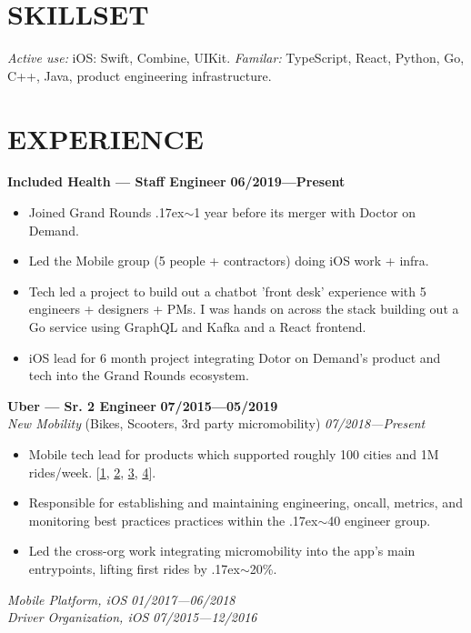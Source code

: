 \documentclass[line,margin]{res}
\newcommand{\goodtilde}{\raise.17ex\hbox{$\scriptstyle\mathtt{\sim}$}}
\begin{document}
\address{adam@zethrae.us}
\address{+1 (401) 339-8675}

 
\begin{resume}

\section{SKILLSET}
    {\sl Active use:} iOS: Swift, Combine, UIKit.
    {\sl Familar:} TypeScript, React, Python, Go, C++, Java, product engineering infrastructure.

\section{EXPERIENCE}
    \textbf{Included Health — Staff Engineer} \hfill \textbf{06/2019—Present}
    \begin{itemize}  \itemsep -1pt
        \item Joined Grand Rounds \goodtilde1 year before its merger with Doctor on Demand.
        \item Led the Mobile group (5 people + contractors) doing iOS work + infra.
        \item Tech led a project to build out a chatbot 'front desk' experience with 5 engineers + designers + PMs. I was hands on across the stack building out a Go service using GraphQL and Kafka and a React frontend.
        \item iOS lead for 6 month project integrating Dotor on Demand's product and tech into the Grand Rounds ecosystem.
    \end{itemize}
    \textbf{Uber — Sr. 2 Engineer} \hfill \textbf{07/2015—05/2019}\\
    {\sl New Mobility} (Bikes, Scooters, 3rd party micromobility) \hfill {\sl07/2018—Present}
    \begin{itemize}  \itemsep -1pt
        \item Mobile tech lead for products which supported roughly 100 cities and 1M rides/week. [\href{https://www.uber.com/newsroom/jump-scooters/}{1}, \href{https://www.theverge.com/2018/7/9/17548848/uber-investment-lime-scooter-alphabet}{2}, \href{https://www.uber.com/newsroom/cityscoot-emopeds/}{3}, \href{https://techcrunch.com/2019/07/01/uber-brings-bikes-and-scooters-including-limes-to-the-forefront/}{4}].
        \item Responsible for establishing and maintaining engineering, oncall, metrics, and monitoring best practices practices within the \goodtilde40 engineer group.
        \item Led the cross-org work integrating micromobility into the app's main entrypoints, lifting first rides by \goodtilde20\%.
    \end{itemize}
    {\sl Mobile Platform, iOS} \hfill {\sl01/2017—06/2018} \\
    {\sl Driver Organization, iOS} \hfill {\sl07/2015—12/2016} \\


\end{resume}
\end{document}
